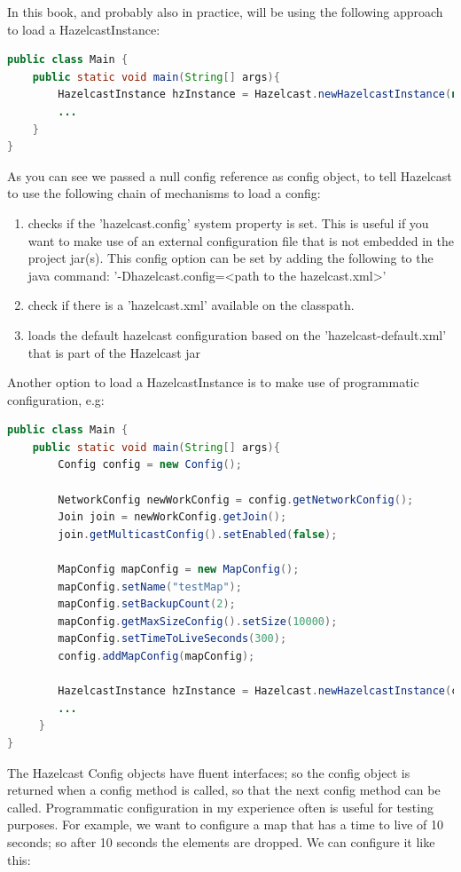 In this book, and probably also in practice, will be using the following approach to load a HazelcastInstance:
\begin{lstlisting}[language=java]
public class Main {
    public static void main(String[] args){
        HazelcastInstance hzInstance = Hazelcast.newHazelcastInstance(null);
        ...
    }
}
\end{lstlisting}
As you can see we passed a null config reference as config object, to tell Hazelcast to use the following chain of mechanisms to load a config:
\begin{enumerate}
\item checks if the 'hazelcast.config' system property is set. This is useful if you want to make use of an external configuration file that is not embedded in the project jar(s). This config option can be set by adding the following to the java command: '-Dhazelcast.config=<path to the hazelcast.xml>' 
\item check if there is a 'hazelcast.xml' available on the classpath. 
\item loads the default hazelcast configuration based on the 'hazelcast-default.xml' that is part of the Hazelcast jar
\end{enumerate}

Another option to load a HazelcastInstance is to make use of programmatic configuration, e.g: 
\begin{lstlisting}[language=java]
public class Main {
    public static void main(String[] args){
        Config config = new Config();
                
        NetworkConfig newWorkConfig = config.getNetworkConfig();
        Join join = newWorkConfig.getJoin();
        join.getMulticastConfig().setEnabled(false);
                
        MapConfig mapConfig = new MapConfig();
        mapConfig.setName("testMap");
        mapConfig.setBackupCount(2);
        mapConfig.getMaxSizeConfig().setSize(10000);
        mapConfig.setTimeToLiveSeconds(300);             
        config.addMapConfig(mapConfig);

        HazelcastInstance hzInstance = Hazelcast.newHazelcastInstance(config);
        ...
     }
}
\end{lstlisting}
The Hazelcast Config objects have fluent interfaces; so the config object is returned when a config method is called, so that the next config method can be called. Programmatic configuration in my experience often is useful for testing purposes. For example, we want to configure a map that has a time to live of 10 seconds; so after 10 seconds the elements are dropped. We can configure it like this:

